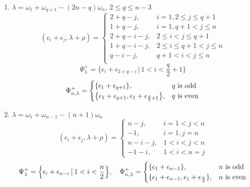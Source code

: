\begin{enumerate}
 
 \item $\lambda =  \omega_1 +\omega_{q+1} - (2n-q)\omega_n$, $ 2\leq q \leq n-3$\\
  \[
   (\epsilon_i + \epsilon_j,\lambda+\rho) = \begin{cases}
                                             2+q-j, & i = 1, 2\leq j \leq q+1 \\
                                             1+q-j, & i = 1, q+1 < j \leq n \\
                                             2+q-i-j, & 2\leq i < j \leq q+1 \\ %
                                             1+q-i-j, & 2\leq i \leq q+1 < j \leq n \\
                                             q-i-j, &   q+1 < i < j \leq n \\
                                            \end{cases}
  \]
  \[
   \Psi^+_\lambda = \Big\{ \epsilon_i + \epsilon_{2+q-i} \,\big|\, 1 < i < \frac{q}{2}+1 \Big\}
  \]
  \[
   \Phi^+_{n,\lambda} = \begin{cases}
                           \{ \epsilon_1 + \epsilon_{q+1}  \}, & q \text{ is odd}\\
                           \big\{ \epsilon_1 + \epsilon_{q+1}, \epsilon_1 + \epsilon_{\frac{q}{2}+1}   \big\}, & q \text{ is even}
                          \end{cases}
  \]
  
 \item $\lambda = \omega_1 +\omega_{n-1} - (n+1)\omega_n $\\
  \[
   (\epsilon_i + \epsilon_j,\lambda+\rho) = \begin{cases}
                                             n - j, & i = 1 < j < n \\
                                             -1, & i = 1, j=n\\
                                             n-i-j, & 1 < i < j < n\\
                                             -1-i, & 1 < i < n = j
                                            \end{cases}
  \]
  \[
   \Psi^+_\lambda = \Big\{ \epsilon_i + \epsilon_{n-i} \,\big|\, 1 < i < \frac{n}{2}\Big\}, \quad 
   \Phi^+_{n,\lambda} = \begin{cases}
				\{\epsilon_1 + \epsilon_{n-1} \}, & n \text{ is odd} \\
				\{\epsilon_1 + \epsilon_{n-1}, \epsilon_1 + \epsilon_{\frac{n}{2}} \}, & n \text{ is even}
			  \end{cases}
  \]
  

\end{enumerate}
